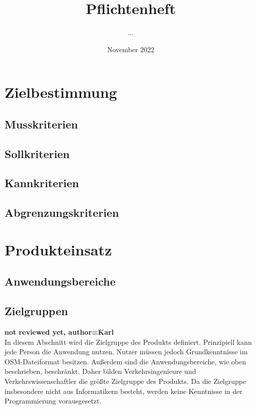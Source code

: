\documentclass[parskip=full]{scrartcl} %
\title{Pflichtenheft}
\author{...}
\date{November 2022}
\begin{document}
\maketitle
\newpage

\tableofcontents
\newpage




\section{Zielbestimmung}

\subsection{Musskriterien}
\subsection{Sollkriterien}
\subsection{Kannkriterien}
\subsection{Abgrenzungskriterien}
\newpage



\section{Produkteinsatz}

\subsection{Anwendungsbereiche}
\subsection{Zielgruppen}
\textbf{not reviewed yet, author=Karl\\}
In diesem Abschnitt wird die Zielgruppe des Produkts definiert. Prinzipiell kann jede Person die Anwendung nutzen. Nutzer müssen jedoch Grundkenntnisse im OSM-Dateiformat besitzen. Außerdem sind die Anwendungsbereiche, wie oben beschrieben, beschränkt. Daher bilden Verkehrsingenieure und Verkehrswissenschaftler die größte Zielgruppe des Produkts. Da die Zielgruppe insbesondere nicht aus Informatikern besteht, werden keine Kenntnisse in der Programmierung vorausgesetzt.
\end{document}
